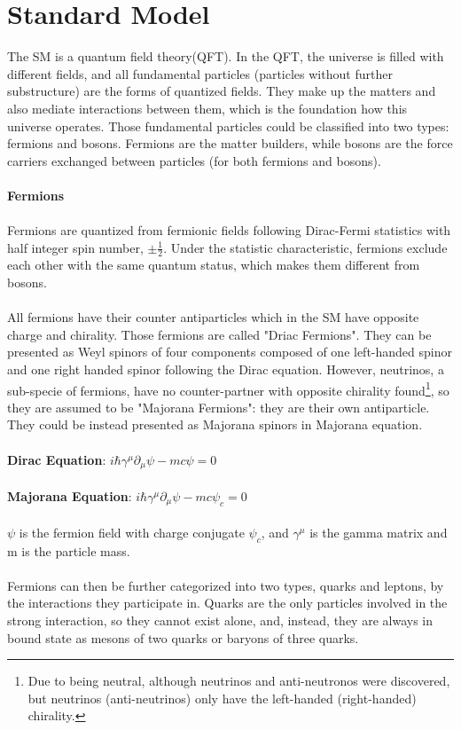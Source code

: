\section{Standard Model\cite{Griffiths,Perkins}}
The SM is a quantum field theory(QFT). In the QFT, the universe is filled with different fields, and all fundamental particles (particles without further substructure) are the forms of quantized fields. They make up the matters and also mediate interactions between them, which is the foundation how this universe operates. Those fundamental particles could be classified into two types: fermions and bosons. Fermions are the matter builders, while bosons are the force carriers exchanged between particles (for both fermions and bosons). 
\\
\\{\bf Fermions}
\\
\\Fermions are quantized from fermionic fields following Dirac-Fermi statistics with half integer spin number, $\pm\frac{1}{2}$. Under the statistic characteristic, fermions exclude each other with the same quantum status, which makes them different from bosons. \\
\\
All fermions have their counter antiparticles which in the SM have opposite charge and chirality. Those fermions are called "Driac Fermions". They can be presented as Weyl spinors of four components composed of one left-handed spinor and one right handed spinor following the Dirac equation. However, neutrinos, a sub-specie of fermions, have no counter-partner with opposite chirality found\footnote{Due to being neutral, although neutrinos and anti-neutronos were discovered, but neutrinos (anti-neutrinos) only have the left-handed (right-handed) chirality.}, so they are assumed to be "Majorana Fermions": they are their own antiparticle. They could be instead presented as Majorana spinors in Majorana equation. 
\\
\\{\bf Dirac Equation}: $i\hbar\gamma^{\mu}\partial_{\mu}\psi-mc\psi=0$ 
\\
\\{\bf Majorana Equation}: $i\hbar\gamma^\mu\partial_\mu\psi-mc\psi_c=0$
\\
\\$\psi$ is the fermion field with charge conjugate $\psi_c$, and $\gamma^\mu$ is the gamma matrix and m is the particle mass.
\\ 
\\Fermions can then be further categorized into two types, quarks and leptons, by the interactions they participate in. Quarks are the only particles involved in the strong interaction, so they cannot exist alone, and, instead, they are always in bound state as mesons of two quarks or baryons of three quarks. 
